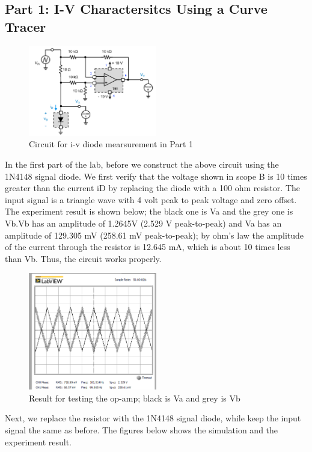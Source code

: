 \documentclass[letterpaper, 10 pt, conference]{ieeeconf}  %
\begin{document}
    \subsection{Part 1: I-V Charactersitcs Using a Curve Tracer}
	\begin{figure}[h]
        \centering
        \includegraphics[width=0.5\textwidth]{images/Part1circuit.png}
        \caption{Circuit for i-v diode mearsurement in Part 1}
    \end{figure}
    In the first part of the lab, before we construct the above circuit using the 1N4148 signal diode. We first verify that the voltage shown in scope B is 10 times greater than the current iD by replacing the diode with a 100 ohm resistor. The input signal is a triangle wave with 4 volt peak to peak voltage and zero offset. The experiment result is shown below; the black one is Va and the grey one is Vb.Vb has an amplitude of 1.2645V (2.529 V peak-to-peak) and Va has an amplitude of 129.305 mV (258.61 mV peak-to-peak); by ohm's law the amplitude of the current through the resistor is 12.645  mA, which is about 10 times less than Vb. Thus, the circuit works properly. \newline
	\begin{figure}[h]
        \centering
        \includegraphics[width=0.5\textwidth]{images/result1.png}
        \caption{Result for testing the op-amp; black is Va and grey is Vb}
    \end{figure}
	Next, we replace the resistor with the 1N4148 signal diode, while keep the input signal the same as before. The figures below shows the simulation and the experiment result. \newline
\end{document}
